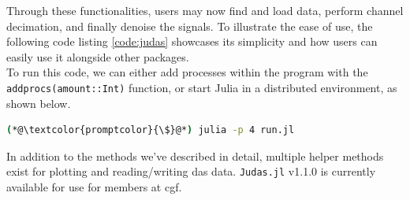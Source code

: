 Through these functionalities, users may now find and load data, perform channel decimation, and finally denoise the signals. To illustrate the ease of use, the following code listing \ref{code:judas} showcases its simplicity and how users can easily use it alongside other packages. \\



To run this code, we can either add processes within the program with the \texttt{addprocs(amount::Int)} function, or start Julia in a distributed environment, as shown below.

\begin{lstlisting}[style=shellcommand, language=bash, caption=How to run a simple script containing Judas snippets]
(*@\textcolor{promptcolor}{\$}@*) julia -p 4 run.jl
\end{lstlisting}

In addition to the methods we've described in detail, multiple helper methods exist for plotting and reading/writing \acrshort{das} data. \texttt{Judas.jl} v1.1.0 is currently available for use for members at \acrshort{cgf}. 

